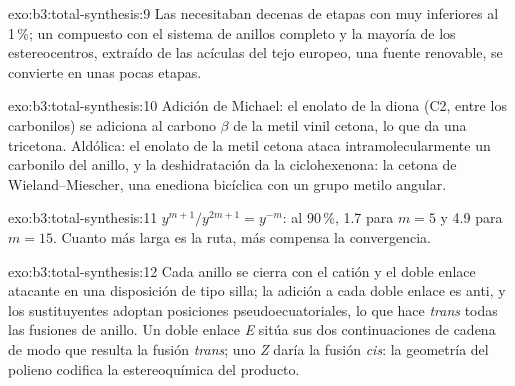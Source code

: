 \begin{solution}{exo:b3:total-synthesis:9}
Las  necesitaban decenas de etapas con  muy inferiores al 1\,\%; un
compuesto con el sistema de anillos completo y la mayoría de los estereocentros, extraído de las
acículas del tejo europeo, una fuente renovable, se convierte en unas pocas etapas.
\end{solution}

\begin{solution}{exo:b3:total-synthesis:10}
Adición de Michael: el enolato de la diona (C2, entre los carbonilos) se adiciona al
carbono $\beta$ de la metil vinil cetona, lo que da una tricetona. Aldólica: el enolato de la metil cetona
ataca intramolecularmente un carbonilo del anillo, y la deshidratación da la
ciclohexenona: la cetona de Wieland--Miescher, una enediona bicíclica con un grupo metilo
angular.
\end{solution}

\begin{solution}{exo:b3:total-synthesis:11}
$y^{m+1}/y^{2m+1} = y^{-m}$: al 90\,\%, 1.7 para $m = 5$ y 4.9 para $m = 15$. Cuanto más larga es la ruta, más
compensa la convergencia.
\end{solution}

\begin{solution}{exo:b3:total-synthesis:12}
Cada anillo se cierra con el catión y el doble enlace atacante en una disposición de tipo
silla; la adición a cada doble enlace es anti, y los sustituyentes adoptan
posiciones pseudoecuatoriales, lo que hace \textit{trans} todas las fusiones de anillo. Un doble enlace \textit{E}
sitúa sus dos continuaciones de cadena de modo que resulta la fusión \textit{trans}; uno \textit{Z}
daría la fusión \textit{cis}: la geometría del polieno codifica la estereoquímica del
producto.
\end{solution}

